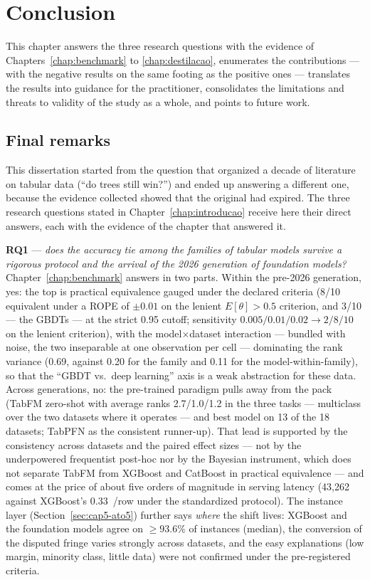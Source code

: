 \chapter{Conclusion}
\label{chap:conclusao}

This chapter answers the three research questions with the evidence
of Chapters~\ref{chap:benchmark} to \ref{chap:destilacao}, enumerates
the contributions --- with the negative results on the same footing
as the positive ones --- translates the results into guidance for the
practitioner, consolidates the limitations and threats to validity of
the study as a whole, and points to future work.

\section{Final remarks}
\label{sec:conc-finais}

This dissertation started from the question that organized a decade
of literature on tabular data (``do trees still win?'') and ended
up answering a different one, because the evidence collected showed that
the original had expired. The three research questions stated in
Chapter~\ref{chap:introducao} receive here their direct answers, each
with the evidence of the chapter that answered it.

\textbf{RQ1} --- \emph{does the accuracy tie among the families of
tabular models survive a rigorous protocol and the arrival of the
2026 generation of foundation models?}
Chapter~\ref{chap:benchmark} answers in two parts. Within the
pre-2026 generation, yes: the top is practical equivalence gauged
under the declared criteria (8/10 equivalent under a ROPE of
$\pm0.01$ on the lenient $E[\theta]>0.5$ criterion, and 3/10 --- the
GBDTs --- at the strict 0.95 cutoff; sensitivity
$0.005/0.01/0.02 \to 2/8/10$ on the lenient criterion), with the
model$\times$dataset interaction --- bundled with noise, the two
inseparable at one observation per cell --- dominating the rank
variance (0.69, against 0.20 for the family and 0.11 for the
model-within-family), so
that the ``GBDT vs.\ deep learning'' axis is a weak abstraction for
these data. Across generations, no: the pre-trained paradigm pulls
away from the pack (TabFM zero-shot with average ranks 2.7/1.0/1.2 in
the three tasks --- multiclass over the two datasets where it
operates --- and best model on 13 of the 18 datasets; TabPFN as the
consistent runner-up). That lead is supported by the consistency
across datasets and the paired effect sizes --- not by the
underpowered frequentist post-hoc nor by the Bayesian instrument,
which does not separate TabFM from XGBoost and CatBoost in practical
equivalence --- and comes at the price of about five orders of
magnitude in serving latency (43{,}262 against XGBoost's
0.33~\us/row under the standardized protocol). The instance layer (Section~\ref{sec:cap5-ato5}) further
says \emph{where} the shift lives: XGBoost and the foundation models
agree on ${\ge}93.6\%$ of instances (median), the conversion of the
disputed fringe varies strongly across datasets, and the
easy explanations (low margin, minority class, little data) were not
confirmed under the pre-registered criteria.

